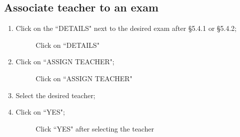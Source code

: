 \documentclass[ManualeUtente]{subfiles}
\begin{document}
\subsection{Associate teacher to an exam}
\begin{enumerate}
	\item Click on the \textquotedblleft DETAILS" next to the desired exam after \S 5.4.1 or \S 5.4.2;
	\begin{figure}[H]
		\centering
		\caption{Click on ``DETAILS"}
		\label{fig:Click on "DETAILS"}
	\end{figure}
	\item Click on \textquotedblleft ASSIGN TEACHER";
	\begin{figure}[H]
		\centering
		\caption{Click on ``ASSIGN TEACHER"}
		\label{fig:Click on "ASSIGN TEACHER"}
	\end{figure}
	\item Select the desired teacher;
	\item Click on \textquotedblleft YES";
	\begin{figure}[H]
		\centering
		\caption{Click ``YES" after selecting the teacher}
		\label{fig:Click "YES" after selecting the teacher}
	\end{figure}
\end{enumerate}
\end{document}
